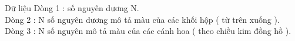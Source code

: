 Dữ liệu
Dòng 1 : số nguyên dương N.   
\\   Dòng 2 : N số nguyên dương mô tả màu của các khối hộp ( từ   trên xuống ).   
\\   Dòng 3 : N số nguyên mô tả màu của các cánh hoa ( theo chiều   kim đồng hồ ).